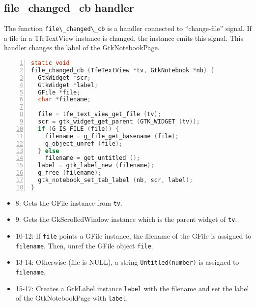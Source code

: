 \subsection{file\_changed\_cb handler}\label{file_changed_cb-handler}

The function \passthrough{\lstinline!file\_changed\_cb!} is a handler
connected to ``change-file'' signal. If a file in a TfeTextView instance
is changed, the instance emits this signal. This handler changes the
label of the GtkNotebookPage.

\begin{lstlisting}[language=C, numbers=left]
static void
file_changed_cb (TfeTextView *tv, GtkNotebook *nb) {
  GtkWidget *scr;
  GtkWidget *label;
  GFile *file;
  char *filename;

  file = tfe_text_view_get_file (tv);
  scr = gtk_widget_get_parent (GTK_WIDGET (tv));
  if (G_IS_FILE (file)) {
    filename = g_file_get_basename (file);
    g_object_unref (file);
  } else
    filename = get_untitled ();
  label = gtk_label_new (filename);
  g_free (filename);
  gtk_notebook_set_tab_label (nb, scr, label);
}
\end{lstlisting}

\begin{itemize}
\tightlist
\item
  8: Gets the GFile instance from \passthrough{\lstinline!tv!}.
\item
  9: Gets the GkScrolledWindow instance which is the parent widget of
  \passthrough{\lstinline!tv!}.
\item
  10-12: If \passthrough{\lstinline!file!} points a GFile instance, the
  filename of the GFile is assigned to
  \passthrough{\lstinline!filename!}. Then, unref the GFile object
  \passthrough{\lstinline!file!}.
\item
  13-14: Otherwise (file is NULL), a string
  \passthrough{\lstinline!Untitled(number)!} is assigned to
  \passthrough{\lstinline!filename!}.
\item
  15-17: Creates a GtkLabel instance \passthrough{\lstinline!label!}
  with the filename and set the label of the GtkNotebookPage with
  \passthrough{\lstinline!label!}.
\end{itemize}
